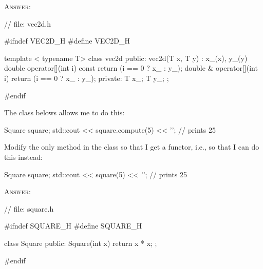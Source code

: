 \textsc{Answer:}
\begin{answercode}
// file: vec2d.h

#ifndef VEC2D_H
#define VEC2D_H

template < typename T>
class vec2d
{
public:
    vec2d(T x, T y)
        : x_(x), y_(y)
    {}
    double operator[](int i) const
    {
        return (i == 0 ? x_ : y_);
    }
    double & operator[](int i)
    {
        return (i == 0 ? x_ : y_);
    }
private:
    T x_;
    T y_;
};

#endif
\end{answercode}


\newpage
\nextq
The class belows allows me to do this:
\begin{console}[fontsize=\small]
Square square;
std::cout << square.compute(5) << '\n'; // prints 25
\end{console}
Modify the only method in the class so that I get a functor, i.e.,
so that I can do this instead:
\begin{console}[fontsize=\small]
Square square;
std::cout << square(5) << '\n'; // prints 25
\end{console}

\textsc{Answer:}
\begin{answercode}
// file: square.h

#ifndef SQUARE_H
#define SQUARE_H

class Square
{
public:
    Square(int x)
    {
        return x * x;
    }
};

#endif
\end{answercode}

\newpage

